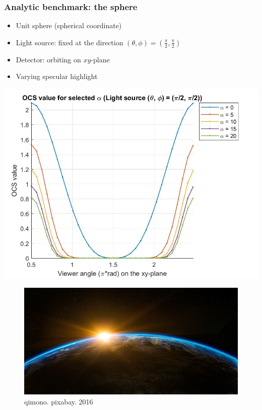 \documentclass{beamer}
\begin{document}
\begin{frame}[t]
\frametitle{Analytic benchmark: the sphere}
\begin{itemize}
\item Unit sphere (spherical coordinate)
\item Light source: fixed at the direction $(\theta,\phi) = (\frac{\pi}{2},\frac{\pi}{2})$
\item Detector: orbiting on $xy$-plane
\item Varying specular highlight
\end{itemize}
\begin{multicols}{2}
\centering \includegraphics[scale=0.13]{./figs/OCS_parallel_plane}
\begin{figure}
\centering \includegraphics[scale=0.1]{./figs/orbiting_example}\caption{qimono.
 pixabay. 2016}
\end{figure}
\end{multicols}
\end{frame}
\end{document}
